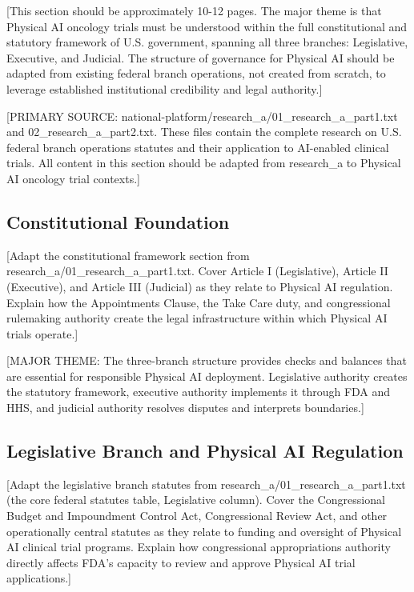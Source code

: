 
[This section should be approximately 10-12 pages. The major theme is that
Physical AI oncology trials must be understood within the full constitutional
and statutory framework of U.S. government, spanning all three branches:
Legislative, Executive, and Judicial. The structure of governance for Physical
AI should be adapted from existing federal branch operations, not created from
scratch, to leverage established institutional credibility and legal authority.]

[PRIMARY SOURCE: national-platform/research\_a/01\_research\_a\_part1.txt and
02\_research\_a\_part2.txt. These files contain the complete research on U.S.
federal branch operations statutes and their application to AI-enabled clinical
trials. All content in this section should be adapted from research\_a to
Physical AI oncology trial contexts.]

\subsection{Constitutional Foundation}
\label{subsec:constitutional}

[Adapt the constitutional framework section from research\_a/01\_research\_a\_part1.txt.
Cover Article I (Legislative), Article II (Executive), and Article III
(Judicial) as they relate to Physical AI regulation. Explain how the
Appointments Clause, the Take Care duty, and congressional rulemaking authority
create the legal infrastructure within which Physical AI trials operate.]

[MAJOR THEME: The three-branch structure provides checks and balances that are
essential for responsible Physical AI deployment. Legislative authority creates
the statutory framework, executive authority implements it through FDA and HHS,
and judicial authority resolves disputes and interprets boundaries.]

\subsection{Legislative Branch and Physical AI Regulation}
\label{subsec:legislative}

[Adapt the legislative branch statutes from research\_a/01\_research\_a\_part1.txt
(the core federal statutes table, Legislative column). Cover the Congressional
Budget and Impoundment Control Act, Congressional Review Act, and other
operationally central statutes as they relate to funding and oversight of
Physical AI clinical trial programs. Explain how congressional appropriations
authority directly affects FDA's capacity to review and approve Physical AI
trial applications.]

